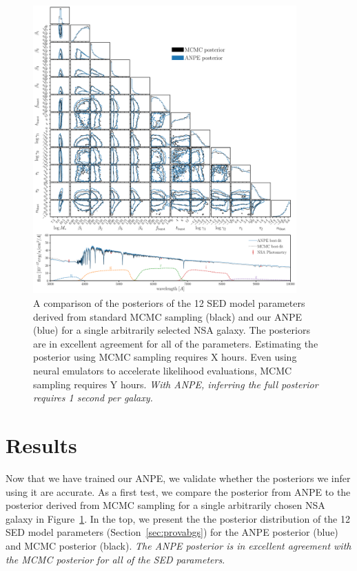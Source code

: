 \begin{figure}
\begin{center}
    \includegraphics[width=0.9\textwidth]{figs/corner.pdf}
    \caption{\label{fig:corner}
    A comparison of the posteriors of the 12 SED model parameters derived from
    standard MCMC sampling (black) and our ANPE (blue) for a single arbitrarily
    selected NSA galaxy.
    The posteriors are in excellent agreement for all of the parameters. 
    Estimating the posterior using MCMC sampling requires X hours. 
    Even using neural emulators to accelerate likelihood evaluations, MCMC
    sampling requires Y hours. 
    \emph{With ANPE, inferring the full posterior requires 1 second per
    galaxy.}
    }
\end{center}
\end{figure}

\section{Results} \label{sec:results}
Now that we have trained our ANPE, we validate whether the posteriors we infer
using it are accurate.
As a first test, we compare the posterior from ANPE to the posterior derived
from MCMC sampling for a single arbitrarily chosen NSA galaxy in
Figure~\ref{fig:corner}. 
In the top, we present the the posterior distribution of the 12 SED model
parameters (Section~\ref{sec:provabgs}) for the ANPE posterior (blue) and MCMC
posterior (black). 
\emph{The ANPE posterior is in excellent agreement with the MCMC posterior for
all of the SED parameters}. 
 
